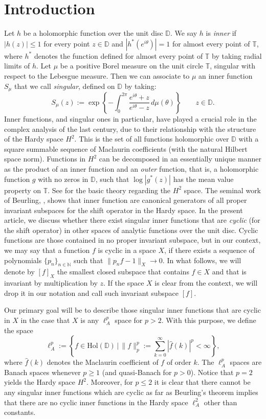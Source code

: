\documentclass{birkjour}
\numberwithin{equation}{section}
\theoremstyle{plain}
\theoremstyle{definition}
\newcommand{\T}{\mathbb{T}}
\newcommand{\D}{\mathbb{D}}
\newcommand{\hol}{\mathrm{Hol}}
\newcommand{\N}{\mathbb{N}}
\newcommand{\1}{\mathds{1}}
\begin{document}
\section{Introduction}

Let $h$ be a holomorphic function over the unit disc $\D$. We say $h$ is \emph{inner} if $|h(z)| \leq 1$ for every point $z \in \D$ and $|h^*(e^{i\theta})| = 1$ for almost every point of $\T$, where $h^*$ denotes the function defined for almost every point of $\T$ by taking radial limits of $h$.
Let $\mu$ be a positive Borel measure on the unit circle $\T$, singular with respect to the Lebesgue measure. Then we can associate to $\mu$ an inner function $S_\mu$ that we call \emph{singular}, defined on $\D$ by taking:
\begin{equation}
\label{eqn:singularinner}
S_\mu(z):=\exp\left\{-\int_0^{2\pi}\frac{e^{i\theta}+z}{e^{i\theta}-z}\,d\mu(\theta)\right\}\qquad z\in\D.
\end{equation}
Inner functions, and singular ones in particular, have played a crucial role in the complex analysis of the last century, due to their relationship with the structure of the Hardy space $H^2$. This is the set of all functions holomorphic over $\D$ with a square summable sequence of Maclaurin coefficients (with the natural Hilbert space norm). Functions in $H^2$ can be decomposed in an essentially unique manner as the product of an inner function and an \emph{outer} function, that is, a holomorphic function $g$ with no zeros in $\D$, such that $\log|g^*(z)|$ has the mean value property on $\T$.  See \cite{garnett} for the basic theory regarding the $H^2$ space. The seminal work of Beurling, \cite{Beurling48}, shows that inner function are canonical generators of all proper invariant subspaces for the shift operator in the Hardy space. In the present article, we discuss whether there exist singular inner functions that are \emph{cyclic} (for the shift operator) in other spaces of analytic functions over the unit disc. Cyclic functions are those contained in no proper invariant subspace, but in our context, we may say that a function $f$ is cyclic in a space $X$, if there exists a sequence of polynomials $\{p_n\}_{n\in \N}$ such that $\|p_n f-1\|_X\rightarrow 0$. In what follows, we will denote by $[f]_X$ the smallest closed subspace that contains $f\in X$ and that is invariant by multiplication by $z$. If the space $X$ is clear from the context, we will drop it in our notation and call such invariant subspace $[f]$.

Our primary goal will be to describe those singular inner functions that are cyclic in $X$ in the case that $X$ is any $\ell^p_A$ space for $p>2$. With this purpose, we define the space
\[
\ell^{p}_A:=\left\{f\in\hol(\D)\,\bigg|\,\|f\|^p_p:=\sum_{k=0}^\infty|\hat f(k)|^p<\infty\right\},
\] 
where $\hat f(k)$ denotes the Maclaurin coefficient of $f$ of order $k$. The $\ell^p_A$ spaces are Banach spaces whenever $p \geq 1$ (and quasi-Banach for $p>0$). Notice that $p=2$ yields the Hardy space $H^2$. Moreover, for $p \leq 2$ it is clear that there cannot be any singular inner functions which are cyclic as far as Beurling's theorem implies that there are no cyclic inner functions in the Hardy space $\ell^2_A$ other than constants.
\end{document}
